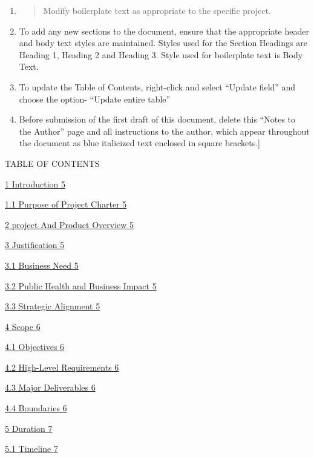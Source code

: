 \begin{enumerate}
\def\labelenumi{\arabic{enumi}.}
\item
  \begin{quote}
  Modify boilerplate text as appropriate to the specific project.
  \end{quote}
\item
  To add any new sections to the document, ensure that the appropriate
  header and body text styles are maintained. Styles used for the
  Section Headings are Heading 1, Heading 2 and Heading 3. Style used
  for boilerplate text is Body Text.
\item
  To update the Table of Contents, right-click and select ``Update
  field'' and choose the option- ``Update entire table''
\item
  Before submission of the first draft of this document, delete this
  ``Notes to the Author'' page and all instructions to the author, which
  appear throughout the document as blue italicized text enclosed in
  square brackets.{]}
\end{enumerate}

TABLE OF CONTENTS

\protect\hyperlink{_Toc141159323}{1 Introduction 5}

\protect\hyperlink{purpose-of-project-charter}{1.1 Purpose of Project
Charter 5}

\protect\hyperlink{project-and-product-overview}{2 project And Product
Overview 5}

\protect\hyperlink{justification}{3 Justification 5}

\protect\hyperlink{business-need}{3.1 Business Need 5}

\protect\hyperlink{public-health-and-business-impact}{3.2 Public Health
and Business Impact 5}

\protect\hyperlink{strategic-alignment}{3.3 Strategic Alignment 5}

\protect\hyperlink{scope}{4 Scope 6}

\protect\hyperlink{objectives}{4.1 Objectives 6}

\protect\hyperlink{high-level-requirements}{4.2 High-Level Requirements
6}

\protect\hyperlink{major-deliverables}{4.3 Major Deliverables 6}

\protect\hyperlink{boundaries}{4.4 Boundaries 6}

\protect\hyperlink{duration}{5 Duration 7}

\protect\hyperlink{timeline}{5.1 Timeline 7}

